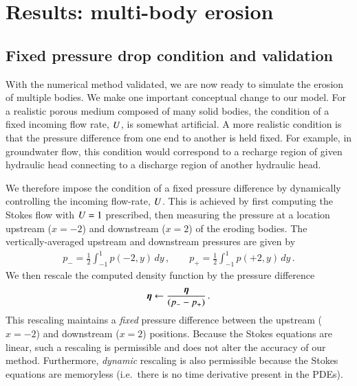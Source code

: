 \documentclass[preprint, 10pt]{elsarticle}
\begin{document}
\section{Results: multi-body erosion}
\label{MultiResults}

\subsection{Fixed pressure drop condition and validation}

With the numerical method validated, we are now ready to simulate the erosion of multiple bodies. We make one important conceptual change to our model. For a realistic porous medium composed of many solid bodies, the condition of a fixed incoming flow rate, $U$, is somewhat artificial. A more realistic condition is that the pressure difference from one end to another is held fixed. For example, in groundwater flow, this condition would correspond to a recharge region of given hydraulic head connecting to a discharge region of another hydraulic head. 

We therefore impose the condition of a fixed pressure difference by dynamically controlling the incoming flow-rate, $U$. This is achieved by first computing the Stokes flow with $U = 1$ prescribed, then measuring the pressure at a location upstream ($x = -2$) and downstream ($x=2$) of the eroding bodies. The vertically-averaged upstream and downstream pressures are given by
\begin{align}
p_{-} = \frac{1}{2} \int_{-1}^{1} p(-2,y) \, dy \, , \qquad
p_{+} = \frac{1}{2} \int_{-1}^{1} p(+2,y) \, dy \, .
\end{align}
We then rescale the computed density function by the pressure difference
\begin{align}
{\boldsymbol\eta} \leftarrow \frac{{\boldsymbol\eta}}{(p_{-} - p_{+})} \, .
\end{align}
This rescaling maintains a {\em fixed} pressure difference between the upstream ($x=-2$) and downstream ($x=2$) positions. Because the Stokes equations are linear, such a rescaling is permissible and does not alter the accuracy of our method. Furthermore, {\em dynamic} rescaling is also permissible because the Stokes equations are memoryless (i.e.~there is no time derivative present in the PDEs).
\end{document}
